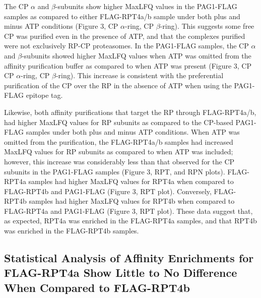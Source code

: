 The CP $\alpha$ and $\beta$-subunits show higher MaxLFQ values in the PAG1-FLAG samples as compared to either FLAG-RPT4a/b sample under both plus and minus ATP conditions (Figure 3, CP $\alpha$-ring, CP $\beta$-ring). This suggests some free CP was purified even in the presence of ATP, and that the complexes purified were not exclusively RP-CP proteasomes. In the PAG1-FLAG samples, the CP $\alpha$ and $\beta$-subunits showed higher MaxLFQ values when ATP was omitted from the affinity purification buffer as compared to when ATP was present (Figure 3, CP CP $\alpha$-ring, CP $\beta$-ring). This increase is consistent with the preferential purification of the CP over the RP in the absence of ATP when using the PAG1-FLAG epitope tag.

Likewise, both affinity purifications that target the RP through FLAG-RPT4a/b, had higher MaxLFQ values for RP subunits as compared to the CP-based PAG1-FLAG samples under both plus and minus ATP conditions. When ATP was omitted from the purification, the FLAG-RPT4a/b samples had increased MaxLFQ values for RP subunits as compared to when ATP was included; however, this increase was considerably less than that observed for the CP subunits in the PAG1-FLAG samples (Figure 3, RPT, and RPN plots). FLAG-RPT4a samples had higher MaxLFQ values for RPT4a when compared to FLAG-RPT4b and PAG1-FLAG (Figure 3, RPT plot). Conversely, FLAG-RPT4b samples had higher MaxLFQ values for RPT4b when compared to FLAG-RPT4a and PAG1-FLAG (Figure 3, RPT plot). These data suggest that, as expected, RPT4a was enriched in the FLAG-RPT4a samples, and that RPT4b was enriched in the FLAG-RPT4b samples.

\subsection{Statistical Analysis of Affinity Enrichments for FLAG-RPT4a Show Little to No Difference When Compared to FLAG-RPT4b}

